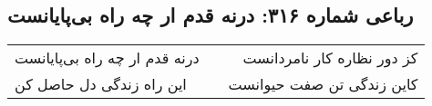 \begin{center}
\section*{رباعی شماره ۳۱۶: درنه قدم ار چه راه بی‌پایانست}
\label{sec:0316}
\begin{longtable}{l p{0.5cm} r}
درنه قدم ار چه راه بی‌پایانست
&&
کز دور نظاره کار نامردانست
\\
این راه زندگی دل حاصل کن
&&
کاین زندگی تن صفت حیوانست
\\
\end{longtable}
\end{center}
